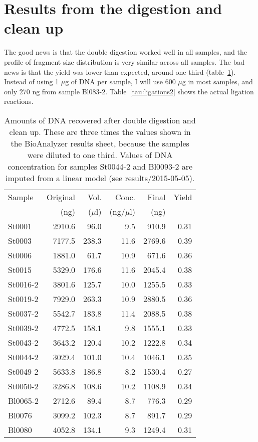 \documentclass[a4paper,12pt,twosided]{article}
\begin{document}
\section{Results from the digestion and clean up}
The good news is that the double digestion worked well in all samples, and the profile of fragment size distribution is very similar across all samples. The bad news is that the yield was lower than expected, around one third (table~\ref{tau:yield}). Instead of using 1 $\mu$g of DNA per sample, I will use 600 $\mu$g in most samples, and only 270 ng from sample Bl083-2. Table~\ref{tau:ligations2} shows the actual ligation reactions.

\begin{table}
\begin{center}
\caption{Amounts of DNA recovered after double digestion and clean up. These are three times the values shown in the BioAnalyzer results sheet, because the samples were diluted to one third. Values of DNA concentration for samples St0044-2 and Bl0093-2 are imputed from a linear model (see results/2015-05-05).}\label{tau:yield}
\vspace*{0.2cm}
\begin{tabular}{lrrrrr}
\toprule
Sample&Original&Vol.&Conc.&Final&Yield\\
&(ng)&($\mu$l)&(ng/$\mu$l)&(ng)&\\
\midrule
St0001&2910.6&96.0&9.5&910.9&0.31\\
St0003&7177.5&238.3&11.6&2769.6&0.39\\
St0006&1881.0&61.7&10.9&671.6&0.36\\
St0015&5329.0&176.6&11.6&2045.4&0.38\\
St0016-2&3801.6&125.7&10.0&1255.5&0.33\\
St0019-2&7929.0&263.3&10.9&2880.5&0.36\\
St0037-2&5542.7&183.8&11.4&2088.5&0.38\\
St0039-2&4772.5&158.1&9.8&1555.1&0.33\\
St0043-2&3643.2&120.4&10.2&1222.8&0.34\\
St0044-2&3029.4&101.0&10.4&1046.1&0.35\\
St0049-2&5633.8&186.8&8.2&1530.4&0.27\\
St0050-2&3286.8&108.6&10.2&1108.9&0.34\\
Bl0065-2&2712.6&89.4&8.7&776.3&0.29\\
Bl0076&3099.2&102.3&8.7&891.7&0.29\\
Bl0080&4052.8&134.1&9.3&1249.4&0.31\\

\end{tabular}
\end{center}
\end{table}
\end{document}
